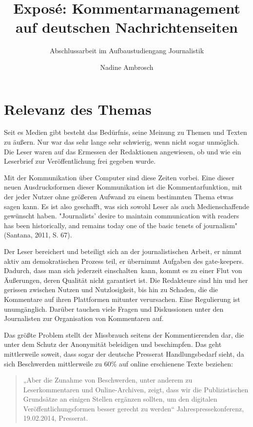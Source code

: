 \documentclass[12pt,titlepage=no,parskip=full]{scrartcl} %
\title{Exposé: Kommentarmanagement auf deutschen Nachrichtenseiten}
\subtitle{Abschlussarbeit im Aufbaustudiengang Journalistik}
\author{Nadine Ambrosch}
\begin{document}
\maketitle




\section{Relevanz des Themas}

Seit es Medien gibt besteht das Bedürfnis, seine Meinung zu Themen und Texten zu
äußern. Nur war das sehr lange sehr schwierig, wenn nicht sogar unmöglich. Die
Leser waren auf das Ermessen der Redaktionen angewiesen, ob und wie ein
Leserbrief zur Veröffentlichung frei gegeben wurde. 

Mit der Kommunikation über
Computer sind diese Zeiten vorbei. Eine dieser neuen Ausdrucksformen dieser
Kommunikation ist die Kommentarfunktion, mit der jeder Nutzer ohne größeren
Aufwand zu einem bestimmten Thema etwas sagen kann. Es ist also geschafft, was
sich sowohl Leser als auch Medienschaffende gewünscht haben. "Journalists’ desire to 
maintain communication with readers has
been historically, and remains today one of the basic tenets of journalism" (Santana, 2011, S. 67).

Der Leser bereichert und beteiligt sich an der journalistischen Arbeit, er nimmt
aktiv am demokratischen Prozess teil, er übernimmt Aufgaben des gate-keepers.
Dadurch, dass man sich jederzeit \glqq einschalten\grqq\ kann, kommt es zu
einer Flut von Äußerungen, deren Qualität nicht garantiert ist. Die Redakteure
sind hin und her gerissen zwischen Nutzen und Nutzlosigkeit, bis hin zu Schaden,
die die Kommentare auf ihren Plattformen mitunter verursachen. Eine Regulierung
ist unumgänglich. Darüber tauchen viele Fragen und Diskussionen unter den
Journalisten zur Organisation von Kommentaren auf.

Das größte Problem stellt der Missbrauch seitens der Kommentierenden dar, die unter dem Schutz
der Anonymität beleidigen und beschimpfen. Das geht mittlerweile soweit, dass
sogar der deutsche Presserat Handlungsbedarf sieht, da sich Beschwerden
mittlerweile zu 60\% auf online erschienene Texte beziehen:

\begin{quote}
„Aber die Zunahme
von Beschwerden, unter anderem zu Leserkommentaren und Online-Archiven, zeigt,
dass wir die Publizistischen Grundsätze an einigen Stellen ergänzen sollten, um
den digitalen Ver\-öffentlichungs\-for\-men besser gerecht zu werden“
Jahrespressekonferenz, 19.02.2014, Presserat. 
\end{quote}
\end{document}
